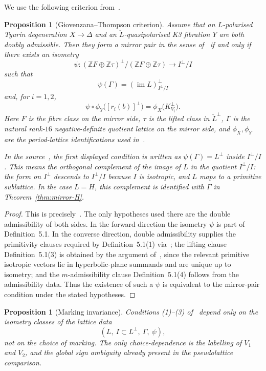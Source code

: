 \documentclass[12pt]{article}
\theoremstyle{plain}
\newtheorem{proposition}[theorem]{Proposition}
\theoremstyle{definition}
\newcommand{\bZ}{\mathbb{Z}}
\newcommand{\Lcheck}{\check{L}}
\begin{document}
We use the following criterion from~\cite{GT24}.

\begin{proposition}[Giovenzana--Thompson criterion]\label{prop:GT-criterion}
Assume that an $L$-polarised Tyurin degeneration $X\to\Delta$ and an $\Lcheck$-quasipolarised K3 fibration $Y$ are both doubly admissible.  Then they form a mirror pair in the sense of~\cite[Definition~5.1]{GT24} if and only if there exists an isometry
\[
\psi\colon (\bZ F\oplus \bZ \tau)^\perp/(\bZ F\oplus \bZ\tau)
\longrightarrow I^\perp/I
\]
such that
\[
\psi(\Gamma)= (\operatorname{im} L)^\perp_{I^\perp/I}
\]
and, for $i=1,2$,
\[
\psi\circ \phi_Y\bigl([r_i(b)]^\perp\bigr)
=
\phi_X\bigl(K_{V_i}^\perp\bigr).
\]
Here $F$ is the fibre class on the mirror side, $\tau$ is the lifted class in $\Lcheck^\perp$, $\Gamma$ is the natural rank-$16$ negative-definite quotient lattice on the mirror side, and $\phi_X,\phi_Y$ are the period-lattice identifications used in~\cite{GT24}.

In the source~\cite[Proposition~5.3]{GT24}, the first displayed condition is written as $\psi(\Gamma)=L^\perp$ inside $I^\perp/I$.  This means the orthogonal complement of the image of $L$ in the quotient $I^\perp/I$: the form on $I^\perp$ descends to $I^\perp/I$ because $I$ is isotropic, and $L$ maps to a primitive sublattice.  In the case $L=H$, this complement is identified with $\Gamma$ in Theorem~\ref{thm:mirror-H}.
\end{proposition}

\begin{proof}
This is precisely~\cite[Proposition~5.3]{GT24}.  The only hypotheses used there are the double admissibility of both sides.  In the forward direction the isometry $\psi$ is part of Definition~5.1.  In the converse direction, double admissibility supplies the primitivity clauses required by Definition~5.1(1) via~\cite[Propositions~3.33 and 4.28]{GT24}; the lifting clause Definition~5.1(3) is obtained by the argument of~\cite[Lemma~3.32]{GT24}, since the relevant primitive isotropic vectors lie in hyperbolic-plane summands and are unique up to isometry; and the $m$-admissibility clause Definition~5.1(4) follows from the admissibility data.  Thus the existence of such a $\psi$ is equivalent to the mirror-pair condition under the stated hypotheses.
\end{proof}

\begin{proposition}[Marking invariance]\label{prop:marking-invariance}
Conditions (1)--(3) of~\cite[Definition~5.1]{GT24} depend only on the isometry classes of the lattice data
\[
(L,\ I\subset L^\perp,\ \Gamma,\ \psi),
\]
not on the choice of marking.  The only choice-dependence is the labelling of $V_1$ and $V_2$, and the global sign ambiguity already present in the pseudolattice comparison.
\end{proposition}
\end{document}
